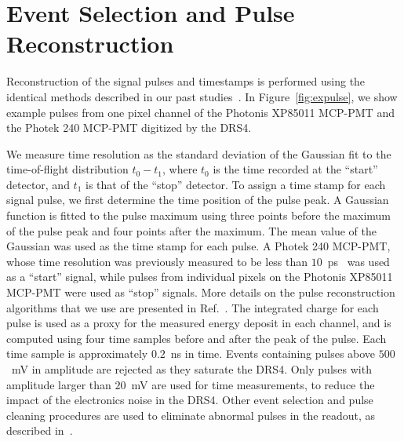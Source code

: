 \documentclass[12pt]{article}
\begin{document}


\section{Event Selection and Pulse Reconstruction}
\label{sec:reconstruction}
Reconstruction of the signal pulses and timestamps is performed using the
identical methods described in our past
studies~\cite{Anderson:2015gha,MCPFastCaloNIMA,Ronzhin:2015pba}.
In Figure~\ref{fig:expulse}, we show example pulses from one pixel channel of
the Photonis XP85011 MCP-PMT and the Photek 240 MCP-PMT digitized by the DRS4.


We measure time resolution as the standard deviation of the Gaussian fit to the
time-of-flight distribution $t_0-t_1$, where $t_0$ is the time recorded at the
``start'' detector, and $t_1$ is that of the ``stop'' detector. To assign a time
stamp for each signal pulse, we first determine the time position of the pulse
peak. A Gaussian function is fitted to the pulse maximum using three points
before the maximum of the pulse peak and four points after the maximum. The mean
value of the Gaussian was used as the time stamp for each pulse. A Photek 240
MCP-PMT, whose time resolution was previously measured to be less than
$10$~ps~\cite{Ronzhin:2015pba} was used as a ``start'' signal, while pulses from
individual pixels on the Photonis XP85011 MCP-PMT were used as ``stop'' signals.
More details on the pulse reconstruction algorithms that we use are presented in
Ref.~\cite{MCPFastCaloNIMA}. The integrated charge for each pulse is used as a
proxy for the measured energy deposit in each channel, and is computed using
four time samples before and after the peak of the pulse. Each time sample is
approximately $0.2$~ns in time. Events containing pulses above $500$~mV in
amplitude are rejected as they saturate the DRS4. Only pulses with amplitude
larger than $20$~mV are used for time measurements, to reduce the impact of the
electronics noise in the DRS4. Other event selection and pulse cleaning
procedures are used to eliminate abnormal pulses in the readout, as described
in~\cite{MCPFastCaloNIMA}. 
\end{document}
